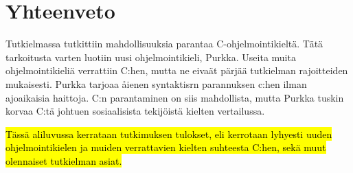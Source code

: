 \section{Yhteenveto}

Tutkielmassa tutkittiin mahdollisuuksia parantaa C-ohjelmointikieltä. Tätä tarkoitusta
varten luotiin uusi ohjelmointikieli, Purkka. Useita muita ohjelmointikieliä verrattiin
C:hen, mutta ne eivaät pärjää tutkielman rajoitteiden mukaisesti. Purkka tarjoaa åienen syntaktisrn
parannuksen c:hen ilman ajoaikaisia haittoja. C:n parantaminen on siis mahdollista, mutta Purkka
tuskin korvaa C:tä johtuen sosiaalisista tekijöistä kielten vertailussa.

\hl{Tässä aliluvussa kerrataan tutkimuksen tulokset, eli kerrotaan lyhyesti
uuden ohjelmointikielen ja muiden verrattavien kielten suhteesta C:hen, sekä
muut olennaiset tutkielman asiat.}
